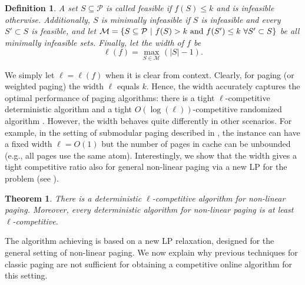 \documentclass[11pt]{article}
\newcommand{\cP}{{\mathcal{P}}}
\newtheorem{definition}[thm]{Definition}
\newtheorem{theorem}[thm]{Theorem}
\begin{document}
\begin{definition}
	\label{def:Mininfeasible}
	A set $S \subseteq \cP$ is called {\em feasible} if $f(S) \leq k$ and is {\em infeasible} otherwise. Additionally, $S$ is {\em minimally  infeasible} if $S$ is infeasible and every $S' \subset S$ is feasible, and let $\mathcal{M} = \left\{S \subseteq \cP~|~f(S)>k \textnormal{ and } f(S') \leq k~\forall S' \subset S \right\}$ be all minimally infeasible sets. Finally, let the {\em width} of $f$ be $$\ell(f) = \max_{S \in \mathcal{M}} \left(|S|-1\right).$$ %
\end{definition}
We simply let $\ell = \ell(f)$ when it is clear from context. 
Clearly, for paging (or weighted paging) the width $\ell$ equals $k$. Hence, the width accurately captures the optimal performance of paging algorithms: there is a tight $\ell$-competitive deterministic algorithm \cite{sleator1985amortized} and a tight $O(\log(\ell))$-competitive randomized algorithm \cite{fiat1991competitive}. However, the width behaves quite differently in other scenarios. For example, in the setting of submodular paging described in , the instance can have a fixed width $\ell = O(1)$ but the number of pages in cache can be unbounded (e.g., all pages use the same atom). Interestingly, we show that the width gives a tight competitive ratio also for general non-linear paging via a new LP for the problem (see ).   %


\begin{theorem}
	\label{thm:deterministic}
	There is a deterministic $\ell$-competitive algorithm for \textnormal{non-linear paging}. Moreover, every deterministic algorithm for  \textnormal{non-linear paging} is at least $\ell$-competitive. 
\end{theorem}

The algorithm achieving  is based on a new LP relaxation, designed for the general setting of non-linear paging. We now explain why previous techniques for classic paging are not sufficient for obtaining a competitive online algorithm for this setting.
\end{document}
